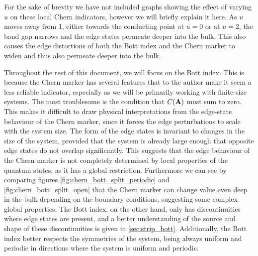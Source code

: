 For the sake of brevity we have not included graphs showing the effect of varying $u$ on these local Chern indicators, however we will briefly explain it here. As $u$ moves away from 1, either towards the conducting point at $u = 0$ or at $u = 2$, the band gap narrows and the edge states permeate deeper into the bulk. This also causes the edge distortions of both the Bott index and the Chern marker to widen and thus also permeate deeper into the bulk.\par 
Throughout the rest of this document, we will focus on the Bott index. This is because the Chern marker has several features that to the author make it seem a less reliable indicator, especially as we will be primarily working with finite-size systems. The most troublesome is the condition that $C(\bf A)$ must sum to zero. This makes it difficult to draw physical interpretations from the edge-state behaviour of the Chern marker, since it forces the edge perturbations to scale with the system size. The form of the edge states is invariant to changes in the size of the system, provided that the system is already large enough that opposite edge states do not overlap significantly. This suggests that the edge behaviour of the Chern marker is not completely determined by local properties of the quantum states, as it has a global restriction. Furthermore we can see by comparing figures \ref{fig:chern_bott_split_periodic} and \ref{fig:chern_bott_split_open} that the Chern marker can change value even deep in the bulk depending on the boundary conditions, suggesting some complex global properties. The Bott index, on the other hand, only has discontinuities where edge states are present, and a better understanding of the source and shape of these discontinuities is given in \textsection\ref{sec:strip_bott}. Additionally, the Bott index better respects the symmetries of the system, being always uniform and periodic in directions where the system is uniform and periodic.\par


